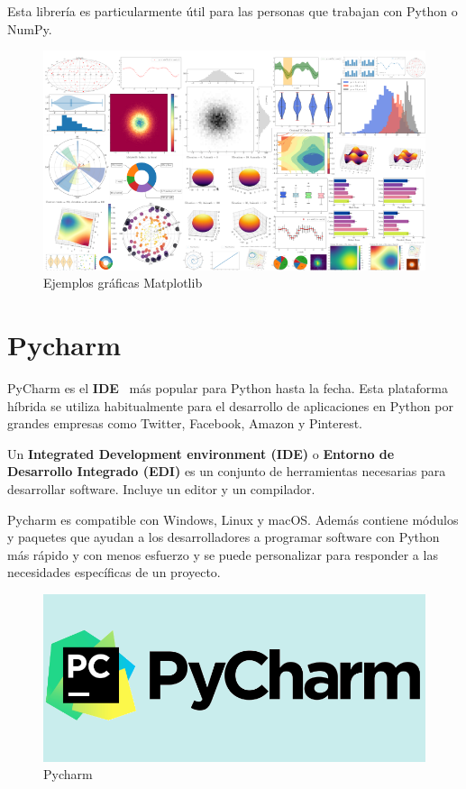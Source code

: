 \documentclass[a4paper, 12pt]{book}
\begin{document}
Esta librería es particularmente útil para las personas que trabajan con Python o NumPy.

\begin{figure}[hb]
	\centering
	\includegraphics[width=14cm, keepaspectratio]{img/Matplotlib.png}
	\caption{Ejemplos gráficas Matplotlib}
	\label{fig:matplotlib}
\end{figure}

\section{Pycharm} 
\label{sec:pycharm}

PyCharm es el \textbf{IDE}~\cite{python:_pycharm} más popular para Python hasta la fecha. Esta plataforma híbrida se utiliza habitualmente para el desarrollo de aplicaciones en Python por grandes empresas como Twitter, Facebook, Amazon y Pinterest.

Un \textbf{Integrated Development environment (IDE)} o \textbf{Entorno de Desarrollo Integrado (EDI)} es un conjunto de herramientas necesarias para desarrollar software. Incluye un editor y un compilador.


Pycharm es compatible con Windows, Linux y macOS. Además contiene módulos y paquetes que ayudan a los desarrolladores a programar software con Python más rápido y con menos esfuerzo y se puede personalizar para responder a las necesidades específicas de un proyecto.

\begin{figure}[hb]
	\centering
	\includegraphics[width=14cm, keepaspectratio]{img/pycharm.png}
	\caption{Pycharm}
	\label{fig:pycharm}
\end{figure}
\end{document}
